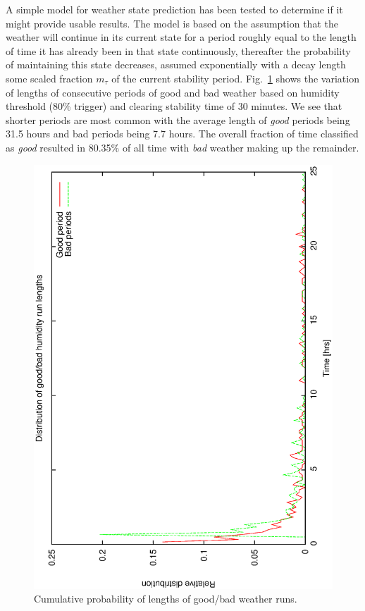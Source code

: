 \documentclass[12pt,a4paper]{article}
\begin{document}
A simple model for weather state prediction has been tested to determine if it might provide usable results.
The model is based on the assumption that the weather will continue in its current state for a period roughly equal to the length of time it has already been in that state continuously, thereafter the probability of maintaining this state decreases, assumed exponentially with a decay length some scaled fraction $m_{\tau}$ of the current stability period. Fig.~\ref{fig:good_bad_hum_dist} shows the variation of lengths of consecutive periods of good and bad weather based on humidity threshold (80\% trigger) and clearing stability time of 30 minutes. We see that shorter periods are most common with the average length of \emph{good} periods being 31.5 hours and bad periods being 7.7 hours. The overall fraction of time classified as \emph{good} resulted in 80.35\% of all time with \emph{bad} weather making up the remainder.

\begin{figure}[htbp] 
\begin{center}
    \includegraphics[scale=0.4, angle=-90]{figures/ecs/good_bad_hum_bin.eps}
\end{center}
\caption[Cumulative probability of lengths of good/bad weather runs.]
{Cumulative probability of lengths of good/bad weather runs.}
\label{fig:good_bad_hum_dist}
\end{figure}
\end{document}
